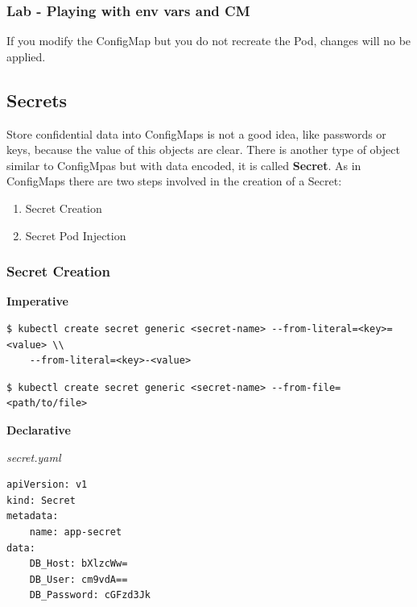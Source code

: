 \documentclass{article}
\newenvironment{blocktemplateIII}[1]{%
    \tcolorbox[beamer,%
    noparskip,breakable,
    ,colframe=Red,%
    colbacklower=LimeGreen!75!LightGreen,%
    title=#1]}%
    {\endtcolorbox}
\newenvironment{codetemplate}[1][]{%
  \mybasecolorbox[#1]
  \itshape
}{%
  \endmybasecolorbox
}
\begin{document}
\subsubsection{Lab - Playing with env vars and CM}

\begin{blocktemplateIII}{WARNING}
If you modify the ConfigMap but you do not recreate the Pod, changes will no be applied.
\end{blocktemplateIII}

\subsection{Secrets}
Store confidential data into ConfigMaps is not a good idea, like passwords or keys, because the value of this objects are clear. There is another type of object similar to ConfigMpas but with data encoded, it is called \textbf{Secret}. As in ConfigMaps there are two steps involved in the creation of a Secret:
\begin{enumerate}
    \item Secret Creation
    \item Secret Pod Injection
\end{enumerate}

\subsubsection{Secret Creation}

\textbf{Imperative}
\begin{codetemplate}{}
\begin{verbatim}
$ kubectl create secret generic <secret-name> --from-literal=<key>=<value> \\
    --from-literal=<key>-<value>
\end{verbatim}
\end{codetemplate}

\begin{codetemplate}{}
\begin{verbatim}
$ kubectl create secret generic <secret-name> --from-file=<path/to/file>
\end{verbatim}
\end{codetemplate}

\textbf{Declarative}

\begin{codetemplate}{secret.yaml}
\begin{verbatim}
apiVersion: v1
kind: Secret
metadata:
    name: app-secret
data:
    DB_Host: bXlzcWw=
    DB_User: cm9vdA==
    DB_Password: cGFzd3Jk
\end{verbatim}
\end{codetemplate}
\end{document}
